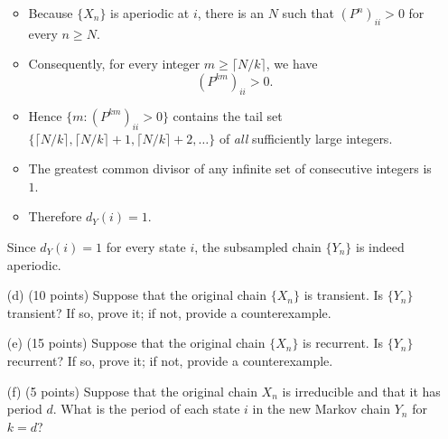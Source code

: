 \documentclass{article}
\begin{document}
\begin{enumerate}
{\begin{itemize}
\item Because $\{X_n\}$ is aperiodic at $i$, there is an $N$ such that $(P^n)_{ii}>0$ for every $n \ge N$.
\item Consequently, for every integer $m \ge \lceil N/k \rceil$, we have 
\[
  (P^{km})_{ii} > 0.
\]
\item Hence $\{ m : (P^{km})_{ii}>0\}$ contains the tail set $\{\lceil N/k\rceil, \lceil N/k\rceil +1, \lceil N/k\rceil+2, \dots\}$ of \emph{all} sufficiently large integers.
\item The greatest common divisor of any infinite set of consecutive integers is~$1$.
\item Therefore $d_Y(i) = 1$.
\end{itemize}
Since $d_Y(i)=1$ for every state $i$, the subsampled chain $\{Y_n\}$ is indeed aperiodic.
}
        
        \item[(d)] (10 points) Suppose that the original chain $\{X_n\}$ is transient. Is $\{Y_n\}$ transient? If so, prove it; if not, provide a counterexample.

            \textcolor{blue}{}

        
        \item[(e)] (15 points) Suppose that the original chain $\{X_n\}$ is recurrent. Is $\{Y_n\}$ recurrent? If so, prove it; if not, provide a counterexample.

            \textcolor{blue}{}

        
        \item[(f)] (5 points) Suppose that the original chain $X_n$ is irreducible and that it has period $d$. What is the period of each state $i$ in the new Markov chain $Y_n$ for $k = d$?


\end{enumerate}
\end{document}
